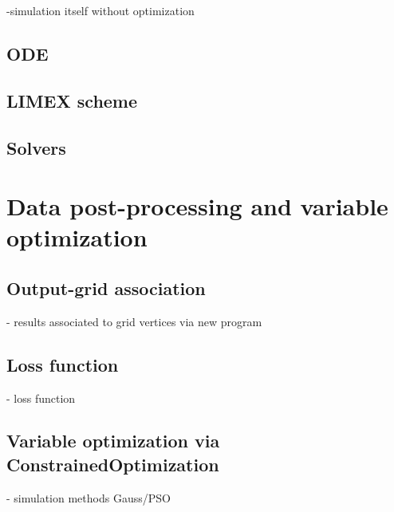 -simulation itself without optimization

\subsection{ODE}


\subsection{LIMEX scheme}


\subsection{Solvers}


\section{Data post-processing and variable optimization}

\subsection{Output-grid association}
- results associated to grid vertices via new program

\subsection{Loss function}
- loss function\\

\subsection{Variable optimization via ConstrainedOptimization}
- simulation methods Gauss/PSO
